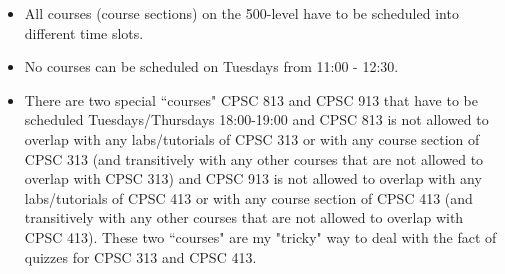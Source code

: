 \documentclass[10pt, oneside]{article}   	%
\begin{document}
\begin{itemize}[topsep=0pt, itemsep=0pt]
\begin{itemize}[topsep=0pt, itemsep=0pt]
    \item All courses (course sections) on the 500-level have to be scheduled into different time slots.
    \item No courses can be scheduled on Tuesdays from 11:00 - 12:30.
    \item There are two special ``courses" CPSC 813 and CPSC 913 that have to be scheduled Tuesdays/Thursdays 18:00-19:00 and CPSC 813 is not allowed to overlap with any labs/tutorials of CPSC 313 or with any course section of CPSC 313 (and transitively with any other courses that are not allowed to overlap with CPSC 313) and CPSC 913 is not allowed to overlap with any labs/tutorials of CPSC 413 or with any course section of CPSC 413 (and transitively with any other courses that are not allowed to overlap with CPSC 413). These two ``courses" are my "tricky" way to deal with the fact of quizzes for CPSC 313 and CPSC 413.
    \end{itemize}
\end{itemize}
\end{document}
